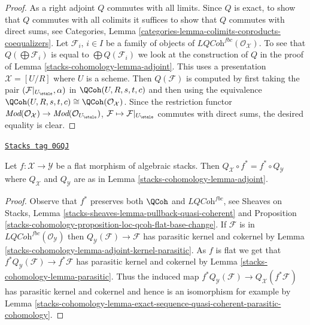 \begin{proof}
\medskip\noindent
As a right adjoint $Q$ commutes with all limits. Since $Q$ is exact, to
show that $Q$ commutes with all colimits it suffices to show that $Q$
commutes with direct sums, see
Categories, Lemma \ref{categories-lemma-colimits-coproducts-coequalizers}.
Let $\mathcal{F}_i$, $i \in I$ be a family of objects of
$\textit{LQCoh}^{fbc}(\mathcal{O}_\mathcal{X})$. To see that
$Q(\bigoplus \mathcal{F}_i)$ is equal to $\bigoplus Q(\mathcal{F}_i)$
we look at the construction of $Q$ in the proof of
Lemma \ref{stacks-cohomology-lemma-adjoint}. This uses a presentation $\mathcal{X} = [U/R]$
where $U$ is a scheme. Then $Q(\mathcal{F})$
is computed by first taking the pair
$(\mathcal{F}|_{U_\etale}, \alpha)$ in $\QCoh(U, R, s, t, c)$
and then using the equivalence
$\QCoh(U, R, s, t, c) \cong \QCoh(\mathcal{O}_\mathcal{X})$.
Since the restriction functor $\textit{Mod}(\mathcal{O}_\mathcal{X}) \to
\textit{Mod}(\mathcal{O}_{U_\etale})$,
$\mathcal{F} \mapsto \mathcal{F}|_{U_\etale}$ commutes with
direct sums, the desired equality is clear.
\end{proof}

\begin{lemma}
\label{stacks-cohomology-lemma-flat-morphism-and-Q}
\href{https://stacks.math.columbia.edu/tag/0GQJ}{\texttt{Stacks tag 0GQJ}}

Let $f : \mathcal{X} \to \mathcal{Y}$ be a flat morphism of algebraic stacks.
Then $Q_\mathcal{X} \circ f^* = f^* \circ Q_\mathcal{Y}$ where
$Q_\mathcal{X}$ and $Q_\mathcal{Y}$ are as in Lemma \ref{stacks-cohomology-lemma-adjoint}.
\end{lemma}

\begin{proof}
Observe that $f^*$ preserves both $\QCoh$ and $\textit{LQCoh}^{fbc}$,
see Sheaves on Stacks, Lemma
\ref{stacks-sheaves-lemma-pullback-quasi-coherent} and
Proposition \ref{stacks-cohomology-proposition-loc-qcoh-flat-base-change}.
If $\mathcal{F}$ is in $\textit{LQCoh}^{fbc}(\mathcal{O}_\mathcal{Y})$
then $Q_\mathcal{Y}(\mathcal{F}) \to \mathcal{F}$
has parasitic kernel and cokernel
by Lemma \ref{stacks-cohomology-lemma-adjoint-kernel-parasitic}.
As $f$ is flat we get that $f^*Q_\mathcal{Y}(\mathcal{F}) \to f^*\mathcal{F}$
has parasitic kernel and cokernel by
Lemma \ref{stacks-cohomology-lemma-parasitic}.
Thus the induced map
$f^*Q_\mathcal{Y}(\mathcal{F}) \to Q_\mathcal{X}(f^*\mathcal{F})$
has parasitic kernel and cokernel and hence is an isomorphism
for example by
Lemma \ref{stacks-cohomology-lemma-exact-sequence-quasi-coherent-parasitic-cohomology}.
\end{proof}

